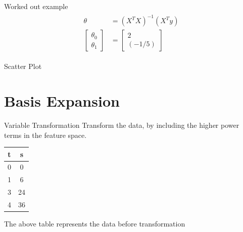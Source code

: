 \documentclass{beamer}
\begin{document}
\begin{frame}{Worked out example}
\begin{align}
\begin{split}
\theta &= (X^{T}X)^{-1}(X^{T}y)\\
\begin{bmatrix}
\theta_{0}\\
\theta_{1}
\end{bmatrix} &= 
\begin{bmatrix}
2\\
(-1/5)
\end{bmatrix} 
\end{split}
\end{align}
\end{frame}

\begin{frame}{Scatter Plot}


\end{frame}



\section{Basis Expansion}

\begin{frame}{Variable Transformation}
    Transform the data, by including the higher power terms in the feature space. 
    
       
    \begin{center}
 \begin{tabular}{||c c||} 
 \hline
 t  & s \\ [0.5ex] 
 \hline\hline
 0 & 0 \\
 1 & 6 \\
 3 & 24 \\
 4 & 36 \\
 \hline
\end{tabular}
\end{center}

The above table represents the data before transformation
\end{frame}
\end{document}
